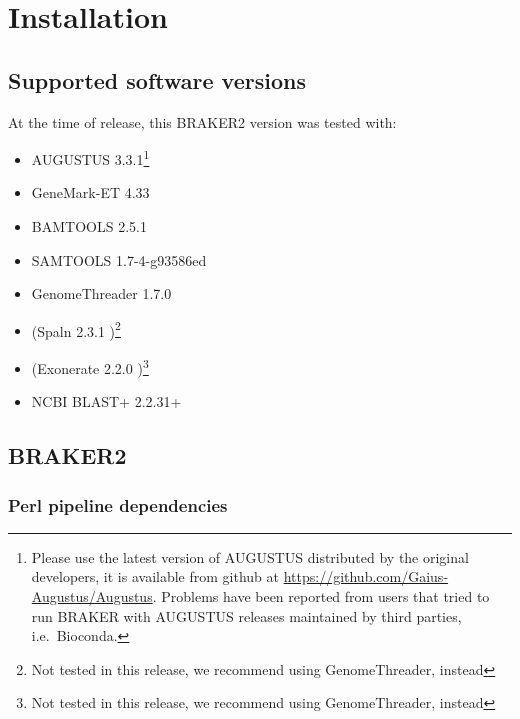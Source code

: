 \documentclass[]{article}
\begin{document}
\hypertarget{installation}{\section{Installation}\label{installation}}

\hypertarget{supported-software-versions}{\subsection{Supported software
versions}\label{supported-software-versions}}

At the time of release, this BRAKER2 version was tested with:

\begin{itemize}
\item
  AUGUSTUS 3.3.1\footnote{Please use the latest version of AUGUSTUS
    distributed by the original developers, it is available from github
    at \url{https://github.com/Gaius-Augustus/Augustus}. Problems have
    been reported from users that tried to run BRAKER with AUGUSTUS
    releases maintained by third parties, i.e.~Bioconda.}
\item
  GeneMark-ET 4.33
\item
  BAMTOOLS 2.5.1 \cite{barnett2011bamtools}
\item
  SAMTOOLS 1.7-4-g93586ed \cite{li2009sequence}
\item
  GenomeThreader 1.7.0 \cite{gremme2013}
\item
  (Spaln 2.3.1 \cite{gotoh2008direct,gotoh2008space,iwata2012benchmarking})\footnote{Not tested in this release, we
    recommend using GenomeThreader, instead}
\item
  (Exonerate 2.2.0 \cite{slater2005automated})\footnote{Not tested in
    this release, we recommend using GenomeThreader, instead}
\item
  NCBI BLAST+ 2.2.31+  \cite{Altschul:1990,camacho2009blast+}
\end{itemize}

\hypertarget{braker2}{\subsection{BRAKER2}\label{braker2}}

\hypertarget{perl-pipeline-dependencies}{\subsubsection{Perl pipeline
dependencies}\label{perl-pipeline-dependencies}}
\end{document}
